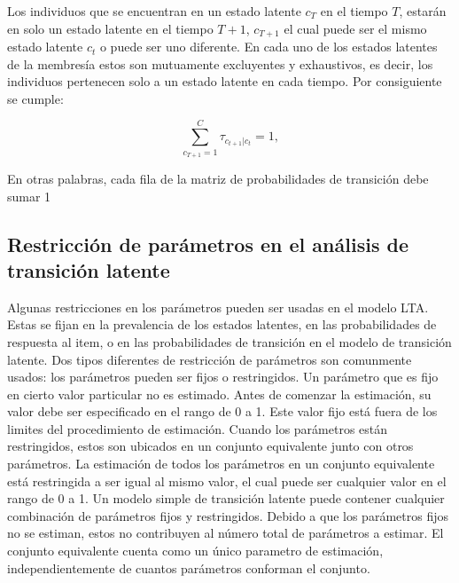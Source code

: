 			Los individuos que se encuentran en un estado latente ${c }_{ T }$ en el tiempo $T$, estar\'{a}n en solo un estado latente en el tiempo $T+1$, ${ c }_{ T+1 }$ el cual puede ser el mismo estado latente ${ c }_{ t }$ o puede ser uno diferente. En cada uno de los estados latentes de la membres\'{i}a estos son mutuamente excluyentes y exhaustivos, es decir, los individuos pertenecen solo a un estado latente en cada tiempo. Por consiguiente se cumple:
			
			\begin{equation}
				\sum_{ { c }_{ T+1 }=1 }^{ C }{ { \tau  }_{ { c }_{ t+1 }|{ c }_{ t } }=1 } , \label{2.21}
			\end{equation}
			
			En otras palabras, cada fila de la matriz de probabilidades de transici\'{o}n debe sumar 1
			
		\subsection{Restricci\'{o}n de par\'{a}metros en el an\'{a}lisis de transici\'{o}n latente}
			Algunas restricciones en los par\'{a}metros pueden ser usadas en el modelo LTA. Estas se fijan en la prevalencia de los estados latentes, en las probabilidades de respuesta al item, o en las probabilidades de transici\'{o}n en el modelo de transici\'{o}n latente. Dos tipos diferentes de restricci\'{o}n de par\'{a}metros son comunmente usados: los par\'{a}metros pueden ser fijos o restringidos. 
			Un par\'{a}metro que es fijo en cierto valor particular no es estimado. Antes de comenzar la estimaci\'{o}n, su valor debe ser especificado en el rango de 0 a 1. Este valor fijo est\'{a} fuera de los limites del procedimiento de estimaci\'{o}n. 
			Cuando los par\'{a}metros est\'{a}n restringidos, estos son ubicados en un conjunto equivalente junto con otros par\'{a}metros. La estimaci\'{o}n de todos los par\'{a}metros en un conjunto equivalente est\'{a} restringida a ser igual al mismo valor, el cual puede ser cualquier valor en el rango de 0 a 1. Un modelo simple de transici\'{o}n latente puede contener cualquier combinaci\'{o}n de par\'{a}metros fijos y restringidos.          
			Debido a que los par\'{a}metros fijos no se estiman, estos no contribuyen al n\'{u}mero total de par\'{a}metros a estimar. El conjunto equivalente cuenta como un \'{u}nico parametro de estimaci\'{o}n, independientemente de cuantos par\'{a}metros conforman el conjunto. 
			
